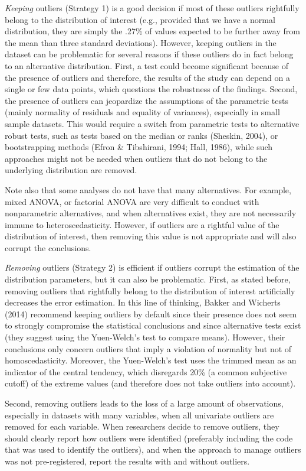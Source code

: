 \documentclass[man,floatsintext]{apa6}
\begin{document}
\emph{Keeping} outliers (Strategy 1) is a good decision if most of these outliers rightfully belong to the distribution of interest (e.g., provided that we have a normal distribution, they are simply the .27\% of values expected to be further away from the mean than three standard deviations). However, keeping outliers in the dataset can be problematic for several reasons if these outliers do in fact belong to an alternative distribution. First, a test could become significant because of the presence of outliers and therefore, the results of the study can depend on a single or few data points, which questions the robustness of the findings. Second, the presence of outliers can jeopardize the assumptions of the parametric tests (mainly normality of residuals and equality of variances), especially in small sample datasets. This would require a switch from parametric tests to alternative robust tests, such as tests based on the median or ranks (Sheskin, 2004), or bootstrapping methods (Efron \& Tibshirani, 1994; Hall, 1986), while such approaches might not be needed when outliers that do not belong to the underlying distribution are removed.

Note also that some analyses do not have that many alternatives. For example, mixed ANOVA, or factorial ANOVA are very difficult to conduct with nonparametric alternatives, and when alternatives exist, they are not necessarily immune to heteroscedasticity. However, if outliers are a rightful value of the distribution of interest, then removing this value is not appropriate and will also corrupt the conclusions.

\emph{Removing} outliers (Strategy 2) is efficient if outliers corrupt the estimation of the distribution parameters, but it can also be problematic. First, as stated before, removing outliers that rightfully belong to the distribution of interest artificially decreases the error estimation. In this line of thinking, Bakker and Wicherts (2014) recommend keeping outliers by default since their presence does not seem to strongly compromise the statistical conclusions and since alternative tests exist (they suggest using the Yuen-Welch's test to compare means). However, their conclusions only concern outliers that imply a violation of normality but not of homoscedasticity. Moreover, the Yuen-Welch's test uses the trimmed mean as an indicator of the central tendency, which disregards 20\% (a common subjective cutoff) of the extreme values (and therefore does not take outliers into account).

Second, removing outliers leads to the loss of a large amount of observations, especially in datasets with many variables, when all univariate outliers are removed for each variable. When researchers decide to remove outliers, they should clearly report how outliers were identified (preferably including the code that was used to identify the outliers), and when the approach to manage outliers was not pre-registered, report the results with and without outliers.
\end{document}
